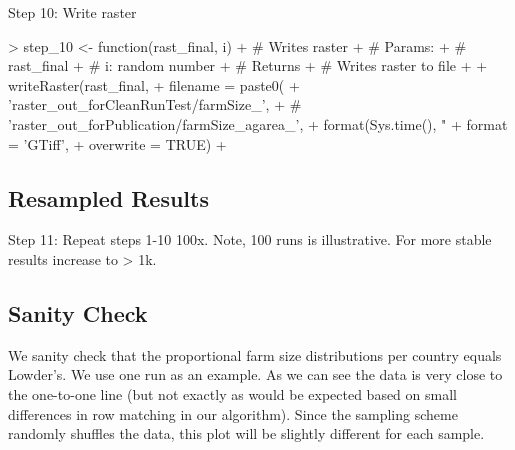 \documentclass{article}
\begin{document}
Step 10: Write raster

\begin{Schunk}
\begin{Sinput}
> step_10 <- function(rast_final, i) {
+   # Writes raster
+   # Params:
+   #   rast_final
+   #   i: random number
+   # Returns
+   #   Writes raster to file
+   
+   writeRaster(rast_final,
+               filename  = paste0(
+                 'raster_out_forCleanRunTest/farmSize_',
+                 # 'raster_out_forPublication/farmSize_agarea_',
+               format(Sys.time(), "%Y%m%d"), '_', i, '.tif'),
+               format    = 'GTiff',
+               overwrite = TRUE)
+ }
\end{Sinput}
\end{Schunk}

\subsection{Resampled Results}


Step 11: Repeat steps 1-10 100x. Note, 100 runs is illustrative. For more stable results increase to > 1k.

\begin{Schunk}
\begin{Sinput}
> # i = 1
> # for (i in 1:100) {  # use for full run
> for (i in 1:2) {      # use for test run
+   dat1 <- steps_1_6(df_lwd)
+   dat2 <- step_7(dat1)
+   dat3 <- step_8(dat2)
+   rast <- step_9(dat3)
+   step_10(rast, i)
+ }
\end{Sinput}
\end{Schunk}


\subsection{Sanity Check}

We sanity check that the proportional farm size distributions per country equals Lowder’s. We use one run as an example. As we can see the data is very close to the one-to-one line (but not exactly as would be expected based on small differences in row matching in our algorithm). Since the sampling scheme randomly shuffles the data, this plot will be slightly different for each sample.





\newpage
\end{document}
